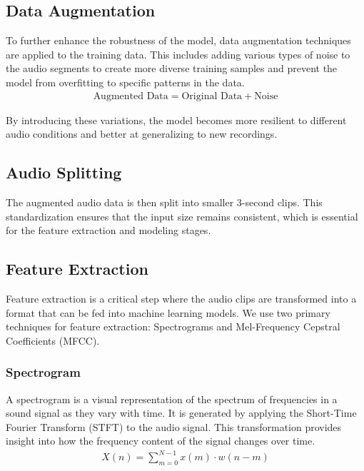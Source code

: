 \subsection{Data Augmentation}

To further enhance the robustness of the model, data augmentation techniques are applied to the training data. This includes adding various types of noise to the audio segments to create more diverse training samples and prevent the model from overfitting to specific patterns in the data.
\begin{eqnarray}
    \text{Augmented Data} = \text{Original Data} + \text{Noise} 
\end{eqnarray}

By introducing these variations, the model becomes more resilient to different audio conditions and better at generalizing to new recordings.

\subsection{Audio Splitting}

The augmented audio data is then split into smaller 3-second clips. This standardization ensures that the input size remains consistent, which is essential for the feature extraction and modeling stages.

\subsection{Feature Extraction}

Feature extraction is a critical step where the audio clips are transformed into a format that can be fed into machine learning models. We use two primary techniques for feature extraction: Spectrograms and Mel-Frequency Cepstral Coefficients (MFCC).

\subsubsection{Spectrogram}

A spectrogram is a visual representation of the spectrum of frequencies in a sound signal as they vary with time. It is generated by applying the Short-Time Fourier Transform (STFT) to the audio signal. This transformation provides insight into how the frequency content of the signal changes over time.
\begin{eqnarray}
    X(n) = \sum_{m=0}^{N-1} x(m) \cdot w(n-m) 
\end{eqnarray}

